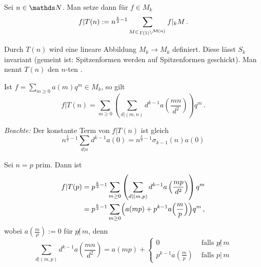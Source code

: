 \begin{defi}
Sei $n \in \NN$. Man setze dann für $f \in M_k$
\[
f | T(n) := n^{\frac k2 - 1} \sum_{M \in \linksmodulo{\Gamma(1)}{\mathcal M (n)}} f |_k M
\,.
\]
\end{defi}

\begin{satz-list}\label{TnEndoMk}
\item Durch $T(n)$ wird eine lineare Abbildung $M_k \to M_k$ definiert. Diese lässt $S_k$ invariant (gemeint ist: Spitzenformen werden auf Spitzenformen geschickt). Man nennt $T(n)$ den $n$-ten .
\item Ist $f = \sum_{m \geq 0} a(m) q^m \in M_k$, so gilt
\[
f | T(n) = \sum_{m \geq 0} \left( \sum_{d | (m,n)} d^{k-1} a\left(\frac{mn}{d^2}\right) \right) q^m
\,.
\]

\emph{Beachte:} Der konstante Term von $f | T(n)$ ist gleich
\[
n^{\frac k2 - 1} \sum_{d|n} d^{k-1} a(0) = n^{\frac k2 - 1} \sigma_{k-1}(n) a(0)
\]
\end{satz-list}

\begin{bsp}
Sei $n = p$ prim. Dann ist
\begin{align*}
f | T(p) &= p^{\frac k2 - 1} \sum_{m \geq 0} \left( \sum_{d | (m,p)} d^{k-1} a\left(\frac{mp}{d^2}\right) \right) q^m\\
&= p^{\frac k2 - 1} \sum_{m \geq 0} \Bigl( a(mp) + p^{k-1} a\Bigl( \frac mp\Bigr) \Bigr) q^m
\,,
\end{align*}
wobei $a\left(\frac mp\right) := 0$ für $p \!\! \not | \, m$, denn
\[
\sum_{d | (m,p)} d^{k-1} a \left( \frac {mn}{d^2} \right) = a(mp) + 
\begin{cases}
0 & \text{ falls } p \!\! \not | \, m\\ 
p^{k-1} a \left(\frac mp \right) & \text{ falls } p | \, m
\end{cases}
\]
\end{bsp}

